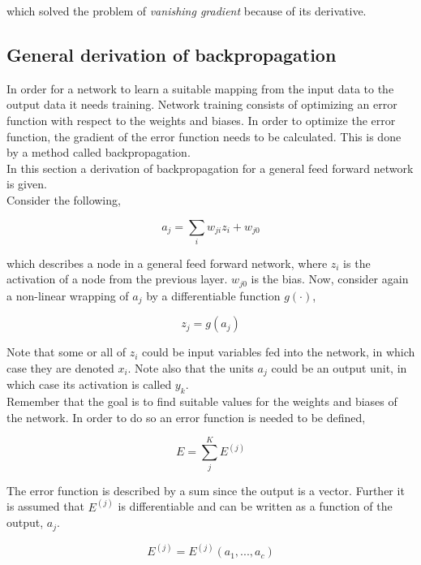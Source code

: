 \documentclass[11pt, letterpaper]{amsart}
\begin{document}
which solved the problem of \textit{vanishing gradient} because of its derivative.

\subsection{General derivation of backpropagation}

In order for a network to learn a suitable mapping from the input data to the output data it needs training. Network training consists of optimizing an error function with respect to the weights and biases. In order to optimize the error function, the gradient of the error function needs to be calculated. This is done by a method called backpropagation.
\\

In this section a derivation of backpropagation for a general feed forward network is given.
\\

Consider the following,

\begin{equation}
    a_j = \sum_{i} w_{ji}z_i + w_{j0}
\end{equation}

which describes a node in a general feed forward network, where $z_i$ is the activation of a node from the previous layer. $w_{j0}$ is the bias. Now, consider again a non-linear wrapping of $a_j$ by a differentiable function $g(\cdot)$,

\begin{equation}
    z_j = g(a_j)
\end{equation}

Note that some or all of $z_i$ could be input variables fed into the network, in which case they are denoted $x_i$. Note also that the units $a_j$ could be an output unit, in which case its activation is called $y_k$.
\\

Remember that the goal is to find suitable values for the weights and biases of the network. In order to do so an error function is needed to be defined,

\begin{equation}
    E = \sum_j^K E^{(j)}
\end{equation}

The error function is described by a sum since the output is a vector. Further it is assumed that $E^{(j)}$ is differentiable and can be written as a function of the output, $a_j$.

\begin{equation}
    E^{(j)} = E^{(j)}(a_1,...,a_c)
\end{equation}
\end{document}
